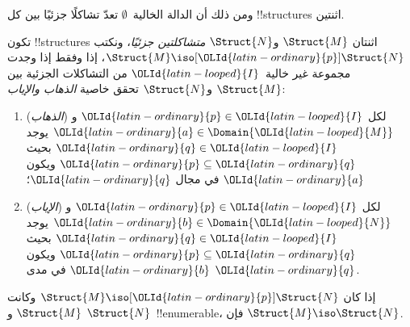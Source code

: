\documentclass[../../../include/open-logic-section]{subfiles}
\begin{document}
ومن ذلك أن الدالة الخالية~$\emptyset$ تعدّ تشاكلًا جزئيًا بين كل
!!{structure}s اثنتين.

\begin{defn}
  تكون !!{structure}s اثنتان $\Struct{M}$ و$\Struct{N}$
  \emph{متشاكلتين جزئيًا}، ونكتب $\Struct{M} \iso[{\OLId{latin-ordinary}{p}}] \Struct{N}$، إذا
  وفقط إذا وجدت مجموعة غير خالية~${\OLId{latin-looped}{I}}$ من التشاكلات الجزئية بين
  $\Struct{M}$ و$\Struct{N}$ تحقق خاصية \emph{الذهاب والإياب}:
  \begin{enumerate}
  \item (\emph{الذهاب}) لكل ${\OLId{latin-ordinary}{p}} \in {\OLId{latin-looped}{I}}$ و${\OLId{latin-ordinary}{a}} \in \Domain {\OLId{latin-looped}{M}}$ يوجد
    ${\OLId{latin-ordinary}{q}} \in {\OLId{latin-looped}{I}}$ بحيث ${\OLId{latin-ordinary}{p}} \subseteq {\OLId{latin-ordinary}{q}}$ ويكون ${\OLId{latin-ordinary}{a}}$ في مجال ${\OLId{latin-ordinary}{q}}$؛
  \item (\emph{الإياب}) لكل ${\OLId{latin-ordinary}{p}} \in {\OLId{latin-looped}{I}}$ و${\OLId{latin-ordinary}{b}} \in \Domain {\OLId{latin-looped}{N}}$ يوجد
    ${\OLId{latin-ordinary}{q}} \in {\OLId{latin-looped}{I}}$ بحيث ${\OLId{latin-ordinary}{p}} \subseteq {\OLId{latin-ordinary}{q}}$ ويكون ${\OLId{latin-ordinary}{b}}$ في مدى ${\OLId{latin-ordinary}{q}}$.
  \end{enumerate}
\end{defn}

\begin{thm}
  إذا كان $\Struct{M} \iso[{\OLId{latin-ordinary}{p}}] \Struct{N}$ وكانت $\Struct{M}$ و
  $\Struct{N}$~!!{enumerable}، فإن $\Struct{M} \iso \Struct{N}$.
\end{thm}
\end{document}
